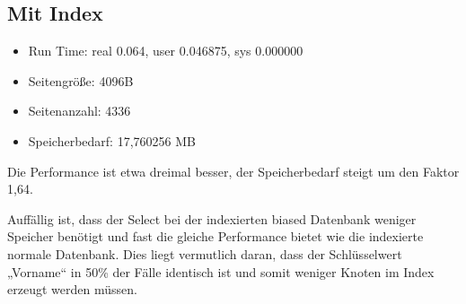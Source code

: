 \documentclass[a4paper,12pt]{article}
\begin{document}
\subsection*{Mit Index}
\begin{itemize}
    \item Run Time: real 0.064, user 0.046875, sys 0.000000
    \item Seitengröße: 4096B
    \item Seitenanzahl: 4336
    \item Speicherbedarf: 17{,}760256 MB
\end{itemize}

Die Performance ist etwa dreimal besser, der Speicherbedarf steigt um den Faktor 1{,}64.

Auffällig ist, dass der Select bei der indexierten biased Datenbank weniger Speicher benötigt und fast die gleiche Performance bietet wie die indexierte normale Datenbank. Dies liegt vermutlich daran, dass der Schlüsselwert „Vorname“ in 50\% der Fälle identisch ist und somit weniger Knoten im Index erzeugt werden müssen.
\end{document}

